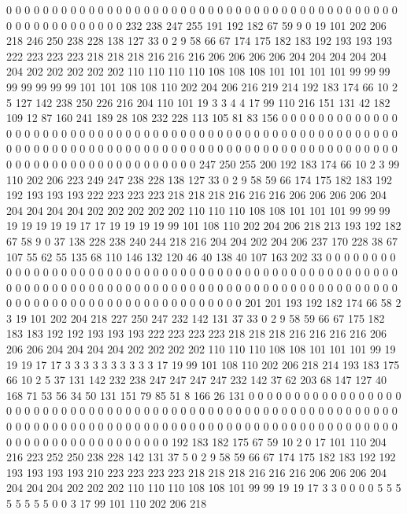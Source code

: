 0 0 0 0 0 0 0 0 0 0 0 0 0 0 0 0 0 0 0 0
0 0 0 0 0 0 0 0 0 0 0 0 0 0 0 0 0 0 0 0
0 0 0 0 0 0 0 0 0 0 0 0 0 0 0 0 232 238 247 255
191 192 182 67 59 9 0 19 101 202 206 218 246 250 238 228 138 127 33 0
2 9 58 66 67 174 175 182 183 192 193 193 193 222 223 223 223 218 218 218
216 216 216 206 206 206 206 204 204 204 204 204 204 202 202 202 202 202 110 110
110 110 108 108 108 101 101 101 101 99 99 99 99 99 99 99 99 101 101 108
108 110 202 204 206 216 219 214 192 183 174 66 10 2 5 127 142 238 250 226
216 204 110 101 19 3 3 4 4 17 99 110 216 151 131 42 182 109 12 87
160 241 189 28 108 232 228 113 105 81 83 156 0 0 0 0 0 0 0 0
0 0 0 0 0 0 0 0 0 0 0 0 0 0 0 0 0 0 0 0
0 0 0 0 0 0 0 0 0 0 0 0 0 0 0 0 0 0 0 0
0 0 0 0 0 0 0 0 0 0 0 0 0 0 0 0 0 0 0 0
0 0 0 0 0 0 0 0 0 0 0 0 0 0 0 0 0 0 0 0
0 0 0 0 0 0 0 0 0 0 0 0 0 0 0 0 0 0 0 0
0 0 0 0 0 0 0 0 0 0 0 0 247 250 255 200 192 183 174 66
10 2 3 99 110 202 206 223 249 247 238 228 138 127 33 0 2 9 58 59
66 174 175 182 183 192 192 193 193 193 222 223 223 223 218 218 218 216 216 216
206 206 206 206 204 204 204 204 204 202 202 202 202 202 110 110 110 108 108 101
101 101 99 99 99 19 19 19 19 19 17 17 19 19 19 19 99 101 108 110
202 204 206 218 213 193 192 182 67 58 9 0 37 138 228 238 240 244 218 216
204 204 202 204 206 237 170 228 38 67 107 55 62 55 135 68 110 146 132 120
46 40 138 40 107 163 202 33 0 0 0 0 0 0 0 0 0 0 0 0
0 0 0 0 0 0 0 0 0 0 0 0 0 0 0 0 0 0 0 0
0 0 0 0 0 0 0 0 0 0 0 0 0 0 0 0 0 0 0 0
0 0 0 0 0 0 0 0 0 0 0 0 0 0 0 0 0 0 0 0
0 0 0 0 0 0 0 0 0 0 0 0 0 0 0 0 0 0 0 0
0 0 0 0 0 0 0 0 0 0 0 0 0 0 0 0 0 0 0 0
0 0 0 0 0 0 0 0 201 201 193 192 182 174 66 58 2 3 19 101
202 204 218 227 250 247 232 142 131 37 33 0 2 9 58 59 66 67 175 182
183 183 192 192 193 193 193 222 223 223 223 218 218 218 216 216 216 216 206 206
206 204 204 204 204 202 202 202 202 110 110 110 108 108 101 101 101 99 19 19
19 17 17 3 3 3 3 3 3 3 3 3 3 17 19 99 101 108 110 202
206 218 214 193 183 175 66 10 2 5 37 131 142 232 238 247 247 247 247 232
142 37 62 203 68 147 127 40 168 71 53 56 34 50 131 151 79 85 51 8
166 26 131 0 0 0 0 0 0 0 0 0 0 0 0 0 0 0 0 0
0 0 0 0 0 0 0 0 0 0 0 0 0 0 0 0 0 0 0 0
0 0 0 0 0 0 0 0 0 0 0 0 0 0 0 0 0 0 0 0
0 0 0 0 0 0 0 0 0 0 0 0 0 0 0 0 0 0 0 0
0 0 0 0 0 0 0 0 0 0 0 0 0 0 0 0 0 0 0 0
0 0 0 0 0 0 0 0 0 0 0 0 0 0 0 0 0 0 0 0
0 0 0 0 192 183 182 175 67 59 10 2 0 17 101 110 204 216 223 252
250 238 228 142 131 37 5 0 2 9 58 59 66 67 174 175 182 183 192 192
193 193 193 193 210 223 223 223 223 218 218 218 216 216 216 206 206 206 204 204
204 204 202 202 202 110 110 110 108 108 101 99 99 19 19 17 3 3 0 0
0 0 5 5 5 5 5 5 5 5 0 0 3 17 99 101 110 202 206 218
